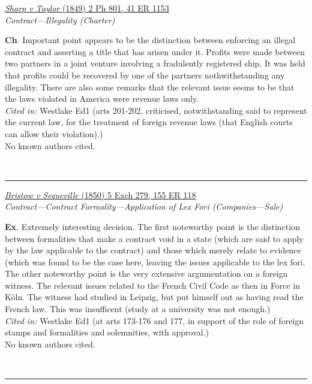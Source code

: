 \documentclass[twoside]{article}
\begin{document}
        \begin{small}
        \begin{center}
        \href{https://heinonline.org/HOL/P?h=hein.engrep/engrc0041&i=1161}{\textit{Sharp v Taylor} (1849) 2 Ph 801, 41 ER 1153} \label{91} \\ 
\textit{Contract---Illegality (Charter)}\\
        \end{center}
        \textbf{Ch}. Important point appears to be the distinction between enforcing an illegal contract and asserting a title that has arisen under it. Profits were made between two partners in a joint venture involving a fradulently registered ship. It was held that profits could be recovered by one of the partners nothwithstanding any illegality.  There are also some remarks that the relevant issue seems to be that the laws violated in America were revenue laws only.\\\textit{Cited in: }Westlake Ed1 (arts 201-202, criticised, notwithstanding said to represent the current law, for the treatment of foreign revenue laws (that English courts can allow their violation).)\\No known authors cited.
        \end{small}\\
        \rule{\textwidth}{0.5pt}
        

        \begin{small}
        \begin{center}
        \href{https://heinonline.org/HOL/P?h=hein.engrep/engrh0155&i=122}{\textit{Bristow v Sequeville} (1850) 5 Exch 279, 155 ER 118} \label{106} \\ 
\textit{Contract---Contract Formality---Application of Lex Fori (Companies---Sale)}\\
        \end{center}
        \textbf{Ex}. Extremely interesting decision. The first noteworthy point is the distinction between formalities that make a contract void in a state (which are said to apply by the law applicable to the contract) and those which merely relate to evidence (which was found to be the case here, leaving the issues applicable to the lex fori. The other noteworthy point is the very extensive argumentation on a foreign witness. The relevant issues related to the French Civil Code as then in Force in Köln. The witness had studied in Leipzig, but put himself out as having read the French law. This was insufficent (study at a university was not enough.)\\\textit{Cited in: }Westlake Ed1 (at arts 173-176 and 177, in support of the role of foreign stamps and formalities and solemnities, with approval.)\\No known authors cited.
        \end{small}\\
        \rule{\textwidth}{0.5pt}
        
\end{document}
